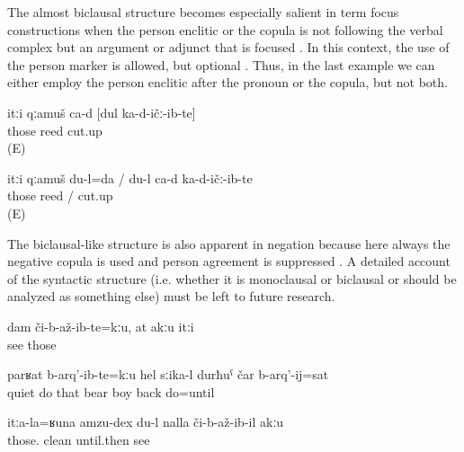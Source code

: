 The almost biclausal structure becomes especially salient in term focus constructions when the person enclitic or the copula is not following the verbal complex but an argument or adjunct that is focused . In this context, the use of the person marker is allowed, but optional . Thus, in the last example we can either employ the person enclitic after the pronoun or the copula, but not both.
%
\begin{exe}
	\ex	\label{ex:It is the reed that I cut analytic}
	\gll	itːi	qːamuš	ca-d	[dul		ka-d-ičː-ib-te]	\\
		those	reed 			cut.up\\
	\glt	{} (E) 

	\ex	\label{ex:It is me who cut the reed analytic}
	\gll	itːi	qːamuš		du-l=da	/ du-l ca-d ka-d-ičː-ib-te	\\
		those	reed		/   cut.up\\
	\glt	{} (E)
\end{exe}

The biclausal-like structure is also apparent in negation because here always the negative copula  is used and person agreement is suppressed . A detailed account of the syntactic structure (i.e. whether it is monoclausal or biclausal or should be analyzed as something else) must be left to future research.
%
\begin{exe}
	\ex	\label{ex:I did not see them, you also (did not see them)}
	\gll	dam	či-b-až-ib-te=kːu,	at	akːu	itːi\\
			see		 	those\\
	\glt	{}

	\ex	\label{ex:‎The bear was not quiet before they did give it its cub back}
	\gll	parʁat	b-arq'-ib-te=kːu	hel	sːika-l		durħuˁ	čar	b-arq'-ij=sat\\
		quiet	do	that	bear	boy	back	do=until\\
	\glt	{}

	\ex	\label{ex:‎A cleanness like theirs I have seen nowhere analytic}
	\gll	itːa-la=ʁuna	amzu-dex	du-l	nalla	či-b-až-ib-il	akːu\\
		those.	clean		until.then	see	\\
	\glt	{}
\end{exe}


